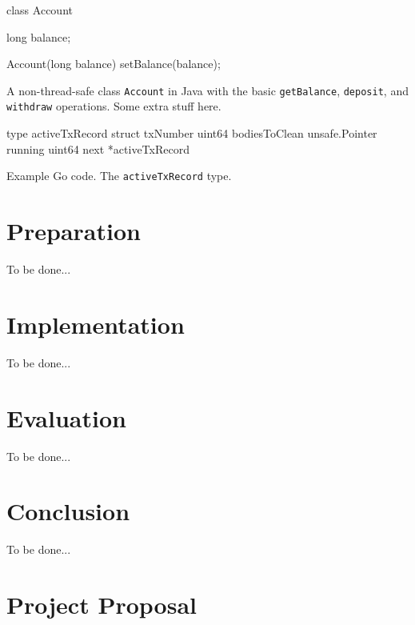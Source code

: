 \documentclass[12pt,a4paper,twoside,openright]{report}
\newcommand{\mycaption}[2]{\caption[#1]{#1 #2}}
\newcommand{\TOBEDONE}{{\LARGE To be done...}}
\newcommand{\javaClass}[1]{\texttt{#1}}
\newcommand{\javaMethod}[1]{\texttt{#1}}
\newcommand{\goType}[1]{\texttt{#1}}
\begin{document}
\begin{Listing}
  \begin{JavaCode}
    class Account {
      long balance;
      
      Account(long balance) {
        setBalance(balance);
      }
    }
  \end{JavaCode}
  \mycaption{A non-thread-safe class \javaClass{Account} in Java with
    the basic \javaMethod{getBalance}, \javaMethod{deposit}, and
    \javaMethod{withdraw} operations.}{Some extra stuff here.}
  \label{lst:account}
\end{Listing}

\begin{Listing}
  \begin{GoCode}
    type activeTxRecord struct {
      txNumber uint64
      bodiesToClean unsafe.Pointer
      running uint64
      next *activeTxRecord
    }
  \end{GoCode}
  \mycaption{Example Go code.}{The \goType{activeTxRecord} type.}
  \label{lst:account}
\end{Listing}

\chapter{Preparation}

\TOBEDONE

\chapter{Implementation}

\TOBEDONE

\chapter{Evaluation}

\TOBEDONE

\chapter{Conclusion}

\TOBEDONE



\appendix

\chapter{Project Proposal}
\end{document}
